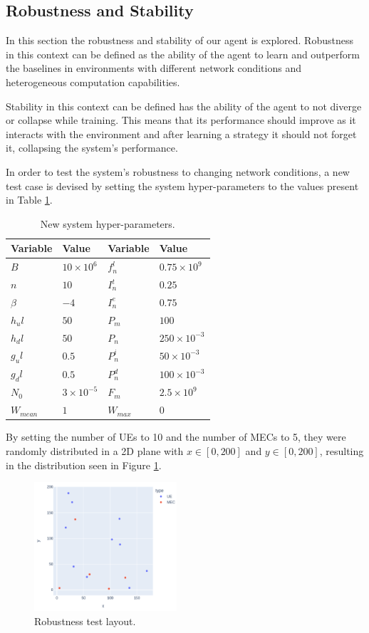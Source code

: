 \documentclass[conference]{IEEEtran}
\begin{document}
\subsection{Robustness and Stability} \label{robustness_stability}

In this section the robustness and stability of our agent is explored. Robustness in this context can be defined as the ability of the agent to learn and outperform the baselines in environments with different network conditions and heterogeneous computation capabilities. 

Stability in this context can be defined has the ability of the agent to not diverge or collapse while training. This means that its performance should improve as it interacts with the environment and after learning a strategy it should not forget it, collapsing the system's performance.

In order to test the system's robustness to changing network conditions, a new test case is devised by setting the system hyper-parameters to the values present in Table \ref{new_hyperparams}.

\begin{table}[H]
\centering
\begin{tabular}{|l|l|l|l|}
\hline
Variable             & Value & Variable                & Value \\ \hline
$B$&$10\times10^{6}$&$f_n^l$&$0.75\times10^{9}$\\
$n$&$10$&$I_n^t$&$0.25$\\
$\beta$&$-4$&$I_n^e$&$0.75$\\
$h_ul$&$50$& $P_m$&$100$\\
$h_dl$&$50$& $P_n$& $250\times10^{-3}$\\
$g_ul$&$0.5$&$P_n^i$&$50\times10^{-3}$\\
$g_dl$&$0.5$&$P_n^d$&$100\times10^{-3}$\\
$N_0$&$3\times10^{-5}$&$F_m$&$2.5\times10^{9}$\\
$W_{mean}$&$1$&$W_{max}$&$0$\\ \hline
\end{tabular}
\caption{New system hyper-parameters.}\label{new_hyperparams}
\end{table}

By setting the number of \acrshort{UE}s to 10 and the number of \acrshort{MEC}s to 5, they were randomly distributed in a 2D plane with $x \in [0, 200]$ and $y \in [0, 200]$, resulting in the distribution seen in Figure \ref{robust_test}.

\begin{figure}[H]
  \centering
  \includegraphics[width=200px]{images/5_10_layout.png}
  \caption{Robustness test layout.}  \label{robust_test}
\end{figure}
\end{document}

